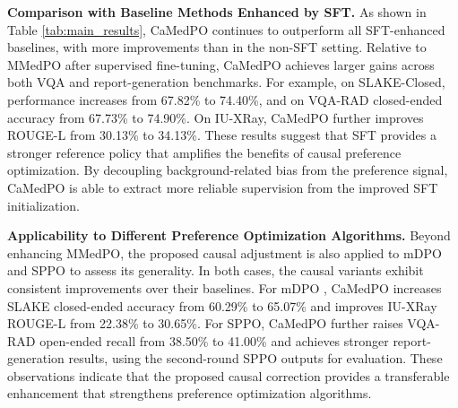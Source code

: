 \noindent\textbf{Comparison with Baseline Methods Enhanced by SFT.}
As shown in Table \ref{tab:main_results}, CaMedPO continues to outperform all SFT-enhanced baselines, with more improvements than in the non-SFT setting. Relative to MMedPO \cite{Zhu2025MMedPO} after supervised fine-tuning, CaMedPO achieves larger gains across both VQA and report-generation benchmarks. For example, on SLAKE-Closed, performance increases from 67.82\% to 74.40\%, and on VQA-RAD closed-ended accuracy from 67.73\% to 74.90\%. On IU-XRay, CaMedPO further improves ROUGE-L from 30.13\% to 34.13\%. These results suggest that SFT provides a stronger reference policy that amplifies the benefits of causal preference optimization. By decoupling background-related bias from the preference signal, CaMedPO is able to extract more reliable supervision from the improved SFT initialization.

\noindent\textbf{Applicability to Different Preference Optimization Algorithms.} Beyond enhancing MMedPO, the proposed causal adjustment is also applied to mDPO and SPPO to assess its generality. In both cases, the causal variants exhibit consistent improvements over their baselines. For mDPO \cite{wang2024mdpo}, CaMedPO increases SLAKE closed-ended accuracy from 60.29\% to 65.07\% and improves IU-XRay ROUGE-L from 22.38\% to 30.65\%. For SPPO, CaMedPO further raises VQA-RAD open-ended recall from 38.50\% to 41.00\% and achieves stronger report-generation results, using the second-round SPPO outputs for evaluation. These observations indicate that the proposed causal correction provides a transferable enhancement that strengthens preference optimization algorithms.



